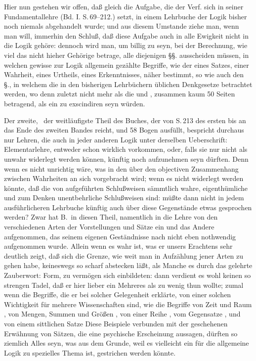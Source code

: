 Hier nun gestehen wir offen, daß gleich die Aufgabe, die der Verf. sich in seiner Fundamentallehre (Bd. I. S.\,69--212.) setzt, in einem Lehrbuche der Logik bisher noch niemals abgehandelt wurde; und aus diesem Umstande ziehe man, wenn man will, immerhin den Schluß, daß diese Aufgabe auch in alle Ewigkeit nicht in die Logik gehöre: dennoch wird man, um billig zu seyn, bei der Berechnung, wie viel das nicht hieher Gehörige betrage, alle diejenigen §§. ausscheiden müssen, in welchen gewisse zur Logik allgemein gezählte Begriffe, wie der eines Satzes, einer Wahrheit, eines Urtheils, eines Erkenntnisses, näher bestimmt, so wie auch den §., in welchem die in den bisherigen Lehrbüchern üblichen Denkgesetze betrachtet werden, wo denn zuletzt nicht mehr als die  und , zusammen kaum 50 Seiten betragend, als ein  zu exscindiren seyn würden. \par
Der zweite, \dh\  der weitläufigste Theil des Buches, der von S.\,213 des ersten bis an das Ende des zweiten Bandes reicht, und 58 Bogen ausfüllt, bespricht durchaus nur Lehren, die auch in jeder anderen Logik unter derselben Ueberschrift: Elementarlehre, entweder schon wirklich vorkommen, oder, falls sie nur nicht als unwahr widerlegt werden können, künftig noch aufzunehmen seyn dürften. Denn wenn es nicht unrichtig wäre, was in den  über den objectiven Zusammenhang zwischen Wahrheiten an sich vorgebracht wird; wenn es nicht widerlegt werden könnte, daß die von  aufgeführten Schlußweisen sämmtlich wahre, eigenthümliche und zum Denken unentbehrliche Schlußweisen sind: müßte dann nicht in jedem ausführlicheren Lehrbuche künftig auch über diese Gegenstände etwas gesprochen werden? Zwar hat B.\ in diesen Theil, namentlich in die Lehre von den verschiedenen Arten der Vorstellungen und Sätze ein und das Andere aufgenommen, das seinem eigenen Geständnisse nach nicht eben nothwendig aufgenommen wurde. Allein wenn es wahr ist, was er unsers Erachtens sehr deutlich zeigt, daß sich die Grenze, wie weit man in Aufzählung jener Arten zu gehen habe, keineswegs so scharf abstecken läßt, als Manche es durch das gelehrte Zauberwort: Form, zu vermögen sich einbildeten: dann verdient es wohl keinen so strengen Tadel, daß er hier lieber ein Mehreres als zu wenig thun wollte; zumal wenn die Begriffe, die er bei solcher Gelegenheit erklärte, von einer solchen Wichtigkeit für mehrere Wissenschaften sind, wie die Begriffe von Zeit und Raum , von Mengen, Summen und Größen , von einer Reihe , vom Gegensatze , und von einem sittlichen Satze  Diese Beispiele verbunden mit der  geschehenen Erwähnung von Sätzen, die eine psychische Erscheinung  aussagen, dürften so ziemlich Alles seyn, was aus dem Grunde, weil es vielleicht ein für die allgemeine Logik zu spezielles Thema ist, gestrichen werden könnte. \par

